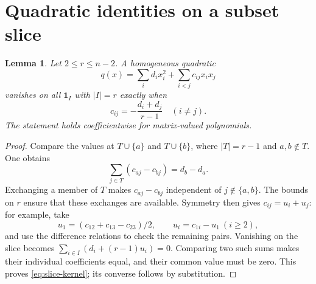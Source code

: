 \documentclass[11pt]{article}
\newtheorem{lemma}[theorem]{Lemma}
\theoremstyle{remark}\newtheorem{remark}[theorem]{Remark}
\newcommand{\one}{\mathbf 1}
\begin{document}
\section{Quadratic identities on a subset slice}
\begin{lemma}\label{lem:slice}
Let $2\leq r\leq n-2$. A homogeneous quadratic
\[
 q(x)=\sum_i d_i x_i^2+\sum_{i<j}c_{ij}x_ix_j
\]
vanishes on all $\one_I$ with $|I|=r$ exactly when
\begin{equation}\label{eq:slice-kernel}
 c_{ij}=-\frac{d_i+d_j}{r-1}\quad(i\ne j).
\end{equation}
The statement holds coefficientwise for matrix-valued polynomials.
\end{lemma}
\begin{proof}
Compare the values at $T\cup\{a\}$ and $T\cup\{b\}$, where $|T|=r-1$ and $a,b\notin T$. One obtains
\[
 \sum_{j\in T}(c_{aj}-c_{bj})=d_b-d_a.
\]
Exchanging a member of $T$ makes $c_{aj}-c_{bj}$ independent of $j\notin\{a,b\}$. The bounds on $r$ ensure that these exchanges are available. Symmetry then gives $c_{ij}=u_i+u_j$: for example, take
\[
 u_1=(c_{12}+c_{13}-c_{23})/2,\qquad u_i=c_{1i}-u_1\ (i\geq2),
\]
and use the difference relations to check the remaining pairs. Vanishing on the slice becomes $\sum_{i\in I}(d_i+(r-1)u_i)=0$. Comparing two such sums makes their individual coefficients equal, and their common value must be zero. This proves \eqref{eq:slice-kernel}; its converse follows by substitution.
\end{proof}
\end{document}
